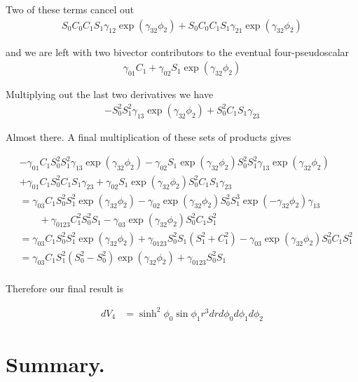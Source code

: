 Two of these terms cancel out
\begin{align*}
S_0 C_0 C_1 S_1 \gamma_{12} \exp( \gamma_{32} \phi_2 ) 
+S_0 C_0 C_1 S_1 \gamma_{21} \exp( \gamma_{32} \phi_2 ) 
\end{align*}

and we are left with two bivector contributors to the eventual four-pseudoscalar
\begin{align*}
\gamma_{01} C_1 
+\gamma_{02} S_1 \exp( \gamma_{32} \phi_2 ) 
\end{align*}

Multiplying out the last two derivatives we have
\begin{align*}
-S_0^2 S_1^2 \gamma_{13} \exp( \gamma_{32} \phi_2 )
+ S_0^2 C_1 S_1 \gamma_{23}
\end{align*}

Almost there.  A final multiplication of these sets of products gives

\begin{align*}
&-\gamma_{01} C_1 S_0^2 S_1^2 \gamma_{13} \exp( \gamma_{32} \phi_2 )
-\gamma_{02} S_1 \exp( \gamma_{32} \phi_2 ) S_0^2 S_1^2 \gamma_{13} \exp( \gamma_{32} \phi_2 ) \\
&+\gamma_{01} C_1 S_0^2 C_1 S_1 \gamma_{23}
+\gamma_{02} S_1 \exp( \gamma_{32} \phi_2 ) S_0^2 C_1 S_1 \gamma_{23} \\
&=
\gamma_{03} C_1 S_0^2 S_1^2 \exp( \gamma_{32} \phi_2 )
-\gamma_{02} \exp( \gamma_{32} \phi_2 ) S_0^2 S_1^3 \exp( -\gamma_{32} \phi_2 ) \gamma_{13} \\
&\qquad +\gamma_{0123} C_1^2 S_0^2 S_1 
-\gamma_{03} \exp( \gamma_{32} \phi_2 ) S_0^2 C_1 S_1^2 \\
&=
\gamma_{03} C_1 S_0^2 S_1^2 \exp( \gamma_{32} \phi_2 )
+\gamma_{0123} S_0^2 S_1 (S_1^2 + C_1^2)
-\gamma_{03} \exp( \gamma_{32} \phi_2 ) S_0^2 C_1 S_1^2 \\
&=
\gamma_{03} C_1 S_1^2 (S_0^2 -S_0^2)\exp( \gamma_{32} \phi_2 )
+\gamma_{0123} S_0^2 S_1  \\
\end{align*}

Therefore our final result is

\begin{align*}
dV_4 &= \sinh^2 \phi_0 \sin\phi_1 r^3 dr d\phi_0 d\phi_1 d\phi_2
\end{align*}

\section{Summary. }

